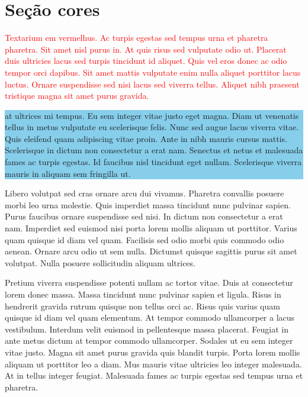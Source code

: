 \documentclass[12pt]{article}
\begin{document}
	\section{Seção cores}
	\pagecolor{yellow} %
	\textcolor{red}{Textarium em vermelhus. Ac turpis egestas sed tempus urna et pharetra pharetra. Sit amet nisl purus in. At quis risus sed vulputate odio ut. Placerat duis ultricies lacus sed turpis tincidunt id aliquet. Quis vel eros donec ac odio tempor orci dapibus. Sit amet mattis vulputate enim nulla aliquet porttitor lacus luctus. Ornare suspendisse sed nisi lacus sed viverra tellus. Aliquet nibh praesent tristique magna sit amet purus gravida.} 
	
	\begin{flushleft}
		\colorbox{SkyBlue}{ %
			\parbox{\textwidth}{%
				at ultrices mi tempus. Eu sem integer vitae justo eget magna. Diam ut venenatis tellus in metus vulputate eu scelerisque felis. Nunc sed augue lacus viverra vitae. Quis eleifend quam adipiscing vitae proin. Ante in nibh mauris cursus mattis. Scelerisque in dictum non consectetur a erat nam. Senectus et netus et malesuada fames ac turpis egestas. Id faucibus nisl tincidunt eget nullam. Scelerisque viverra mauris in aliquam sem fringilla ut.} }
	\end{flushleft}
	
	
	\newpage
	
	Libero volutpat sed cras ornare arcu dui vivamus. Pharetra convallis posuere morbi leo urna molestie. Quis imperdiet massa tincidunt nunc pulvinar sapien. Purus faucibus ornare suspendisse sed nisi. In dictum non consectetur a erat nam. Imperdiet sed euismod nisi porta lorem mollis aliquam ut porttitor. Varius quam quisque id diam vel quam. Facilisis sed odio morbi quis commodo odio aenean. Ornare arcu odio ut sem nulla. Dictumst quisque sagittis purus sit amet volutpat. Nulla posuere sollicitudin aliquam ultrices.
	
	Pretium viverra suspendisse potenti nullam ac tortor vitae. Duis at consectetur lorem donec massa. Massa tincidunt nunc pulvinar sapien et ligula. Risus in hendrerit gravida rutrum quisque non tellus orci ac. Risus quis varius quam quisque id diam vel quam elementum. At tempor commodo ullamcorper a lacus vestibulum. Interdum velit euismod in pellentesque massa placerat. Feugiat in ante metus dictum at tempor commodo ullamcorper. Sodales ut eu sem integer vitae justo. Magna sit amet purus gravida quis blandit turpis. Porta lorem mollis aliquam ut porttitor leo a diam. Mus mauris vitae ultricies leo integer malesuada. At in tellus integer feugiat. Malesuada fames ac turpis egestas sed tempus urna et pharetra.
	
\end{document}
